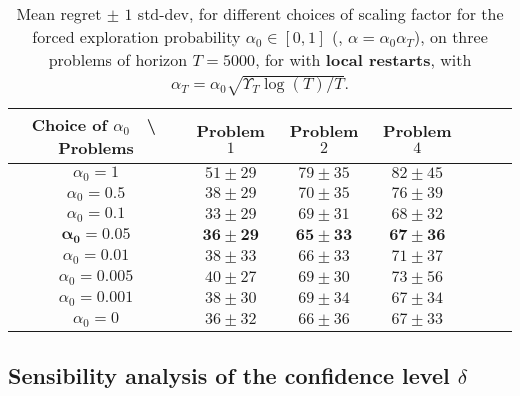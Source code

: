 \begin{small} %
\begin{table}[ht]
    \begin{small} %
    \centering
    \begin{tabular}{c|cccccc}
        \textbf{Choice of} $\alpha_0$ $\;$ \textbackslash $\;$ \textbf{Problems} & Problem $1$ & Problem $2$ & Problem $4$ \\
        \hline
        $\alpha_0=1$     & $51 \pm 29$ & $79 \pm 35$ & $82 \pm 45$ \\
        $\alpha_0=0.5$   & $38 \pm 29$ & $70 \pm 35$ & $76 \pm 39$ \\
        $\alpha_0=0.1$   & $33 \pm 29$ & $69 \pm 31$ & $68 \pm 32$ \\
        $\mathbf{\alpha_0=0.05}$  & $\mathbf{36 \pm 29}$ & $\mathbf{65 \pm 33}$ & $\mathbf{67 \pm 36}$ \\
        $\alpha_0=0.01$  & $38 \pm 33$ & $66 \pm 33$ & $71 \pm 37$ \\
        $\alpha_0=0.005$ & $40 \pm 27$ & $69 \pm 30$ & $73 \pm 56$ \\
        $\alpha_0=0.001$ & $38 \pm 30$ & $69 \pm 34$ & $67 \pm 34$ \\
        $\alpha_0=0$     & $36 \pm 32$ & $66 \pm 36$ & $67 \pm 33$
    \end{tabular}
    \caption{Mean regret $\pm$ $1$ std-dev, for different choices of scaling factor for the forced exploration probability $\alpha_0\in[0,1]$ (\ie, $\alpha=\alpha_0 \alpha_T$), on three problems of horizon $T=5000$, for \GLRklUCB{} with \textbf{local restarts}, with $\alpha_T = \alpha_0\sqrt{\Upsilon_T \log(T)/T}$.}
    \label{table:6:sensibilityAlpha0}
    \end{small} %
\end{table}
\end{small} %


\subsection{Sensibility analysis of the confidence level $\delta$}\label{sec:6:choosingDelta}

